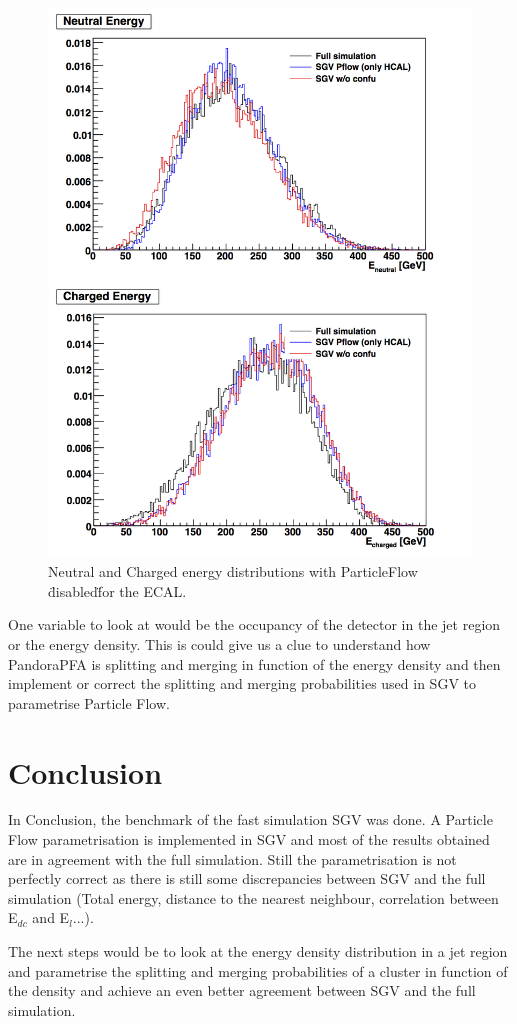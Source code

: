\begin{figure}[t]
  \centering
  \includegraphics[scale=0.5]{chap6/fig_SGV/Total_EneuEcha_notjet_onlyHCAL.png}
  \caption{Neutral and Charged energy distributions with ParticleFlow \"disabled\" for the ECAL.}
  \label{fig:energy_ECALnoPFA}
\end{figure}

One variable to look at would be the occupancy of the detector in the jet region or the energy density. This is could give us a clue to understand how PandoraPFA is splitting and merging in function of the energy density and then implement or correct the splitting and merging probabilities used in SGV to parametrise Particle Flow.

\section{Conclusion}

In Conclusion, the benchmark of the fast simulation SGV was done. A Particle Flow parametrisation is implemented in SGV and most of the results obtained are in agreement with the full simulation. Still the parametrisation is not perfectly correct as there is still some discrepancies between SGV and the full simulation (Total energy, distance to the nearest neighbour, correlation between E$_{dc}$ and E$_l$...).

The next steps would be to look at the energy density distribution in a jet region and parametrise the splitting and merging probabilities of a cluster in function of the density and achieve an even better agreement between SGV and the full simulation.
